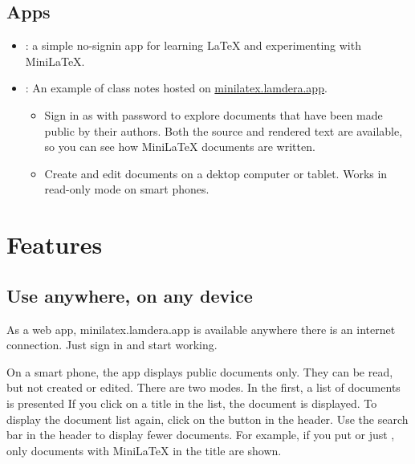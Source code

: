 \subsection{Apps}

\begin{itemize}

\item {}: a simple no-signin app for learning LaTeX and experimenting with MiniLaTeX.

\item {}:  An example of class notes hosted on
\href{https://minilatex.lamdera.app}{minilatex.lamdera.app}.

\begin{itemize}

\item {} Sign in as  with password  to explore documents that have been made public by their authors.  Both the source and rendered text are available, so you can see how MiniLaTeX documents are written.

\item {} Create and edit documents on a dektop computer or tablet. Works in read-only mode on smart phones.

\end{itemize}


\end{itemize}


\section{Features}


\subsection{Use anywhere, on any  device}

As a web app, minilatex.lamdera.app is available anywhere there is an internet connection.  Just sign in and start working.





On a smart phone, the app displays public documents only.  They can be read, but not created or edited.  There are two modes.  In the first, a list of documents is presented If you click on a title in the list, the document is displayed. To display the document list again, click on the  button in the header. Use the search bar in the header to display fewer documents.  For example, if you put  or just , only documents with MiniLaTeX in the title are shown.

